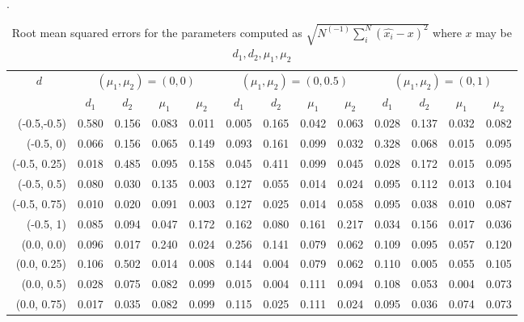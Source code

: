 \documentclass[11pt,fleqn]{article}
\begin{document}
{\begin{landscape}
	\begin{table}[htbp]
		\centering
		\caption{Root mean squared errors for the parameters computed as $ \sqrt{N^{(-1)}\sum_{i}^{N}(\widehat{x_i}-x)^2} $ where $ x $ may be  $d_1,d_2,\mu_1, \mu_2$}.
		\begin{tabular}{|r|rrrr|rrrr|rrrr|}
			\hline
			\multicolumn{1}{|c|}{\multirow{2}[4]{*}{$ d $}} & \multicolumn{4}{c|}{$ (\mu_1,\mu_2)=(0,0)$}    & \multicolumn{4}{c|}{$ (\mu_1,\mu_2)=(0,0.5)$}  & \multicolumn{4}{c|}{$ (\mu_1,\mu_2)=(0,1)$} \\
			\cline{2-13}    \multicolumn{1}{|c|}{} & \multicolumn{1}{c}{$ d_1 $} & \multicolumn{1}{c}{$ d_2$} & \multicolumn{1}{c}{$\mu_1$} & \multicolumn{1}{c|}{$ \mu_2 $} & \multicolumn{1}{c}{$d_1$} & \multicolumn{1}{c}{$d_2$} & \multicolumn{1}{c}{$\mu_1$} & \multicolumn{1}{c|}{$\mu_2$} & \multicolumn{1}{c}{$ d_1 $} & \multicolumn{1}{c}{$d_2$} & \multicolumn{1}{c}{$\mu_1$} & \multicolumn{1}{c|}{$\mu_2$} \\
			\hline
			(-0.5,-0.5) & 0.580 & 0.156 & 0.083 & 0.011 & 0.005 & 0.165 & 0.042 & 0.063 & 0.028 & 0.137 & 0.032 & 0.082 \\
			(-0.5, 0) & 0.066 & 0.156 & 0.065 & 0.149 & 0.093 & 0.161 & 0.099 & 0.032 & 0.328 & 0.068 & 0.015 & 0.095 \\
			(-0.5, 0.25) & 0.018 & 0.485 & 0.095 & 0.158 & 0.045 & 0.411 & 0.099 & 0.045 & 0.028 & 0.172 & 0.015 & 0.095 \\
			(-0.5, 0.5) & 0.080 & 0.030 & 0.135 & 0.003 & 0.127 & 0.055 & 0.014 & 0.024 & 0.095 & 0.112 & 0.013 & 0.104 \\
			(-0.5, 0.75) & 0.010 & 0.020 & 0.091 & 0.003 & 0.127 & 0.025 & 0.014 & 0.058 & 0.095 & 0.038 & 0.010 & 0.087 \\
			(-0.5, 1) & 0.085 & 0.094 & 0.047 & 0.172 & 0.162 & 0.080 & 0.161 & 0.217 & 0.034 & 0.156 & 0.017 & 0.036 \\
			\hline
			(0.0, 0.0) & 0.096 & 0.017 & 0.240 & 0.024 & 0.256 & 0.141 & 0.079 & 0.062 & 0.109 & 0.095 & 0.057 & 0.120 \\
			(0.0, 0.25) & 0.106 & 0.502 & 0.014 & 0.008 & 0.144 & 0.004 & 0.079 & 0.062 & 0.110 & 0.005 & 0.055 & 0.105 \\
			(0.0, 0.5) & 0.028 & 0.075 & 0.082 & 0.099 & 0.015 & 0.004 & 0.111 & 0.094 & 0.108 & 0.053 & 0.004 & 0.073 \\
			(0.0, 0.75) & 0.017 & 0.035 & 0.082 & 0.099 & 0.115 & 0.025 & 0.111 & 0.024 & 0.095 & 0.036 & 0.074 & 0.073 \\

\end{tabular}
\end{table}
\end{landscape}}
\end{document}
